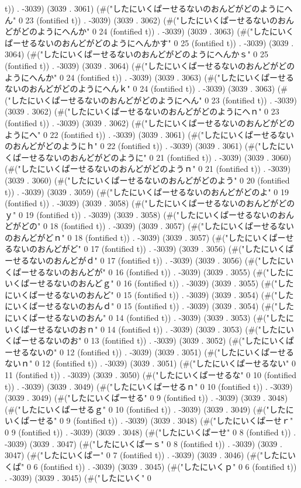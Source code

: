 t)) . -3039) (3039 . 3061) (#("したにいくぱーせるないのおんどがどのようにへん" 0 23 (fontified t)) . -3039) (3039 . 3062) (#("したにいくぱーせるないのおんどがどのようにへんか" 0 24 (fontified t)) . -3039) (3039 . 3063) (#("したにいくぱーせるないのおんどがどのようにへんかす" 0 25 (fontified t)) . -3039) (3039 . 3064) (#("したにいくぱーせるないのおんどがどのようにへんかｓ" 0 25 (fontified t)) . -3039) (3039 . 3064) (#("したにいくぱーせるないのおんどがどのようにへんか" 0 24 (fontified t)) . -3039) (3039 . 3063) (#("したにいくぱーせるないのおんどがどのようにへんｋ" 0 24 (fontified t)) . -3039) (3039 . 3063) (#("したにいくぱーせるないのおんどがどのようにへん" 0 23 (fontified t)) . -3039) (3039 . 3062) (#("したにいくぱーせるないのおんどがどのようにへｎ" 0 23 (fontified t)) . -3039) (3039 . 3062) (#("したにいくぱーせるないのおんどがどのようにへ" 0 22 (fontified t)) . -3039) (3039 . 3061) (#("したにいくぱーせるないのおんどがどのようにｈ" 0 22 (fontified t)) . -3039) (3039 . 3061) (#("したにいくぱーせるないのおんどがどのように" 0 21 (fontified t)) . -3039) (3039 . 3060) (#("したにいくぱーせるないのおんどがどのようｎ" 0 21 (fontified t)) . -3039) (3039 . 3060) (#("したにいくぱーせるないのおんどがどのよう" 0 20 (fontified t)) . -3039) (3039 . 3059) (#("したにいくぱーせるないのおんどがどのよ" 0 19 (fontified t)) . -3039) (3039 . 3058) (#("したにいくぱーせるないのおんどがどのｙ" 0 19 (fontified t)) . -3039) (3039 . 3058) (#("したにいくぱーせるないのおんどがどの" 0 18 (fontified t)) . -3039) (3039 . 3057) (#("したにいくぱーせるないのおんどがどｎ" 0 18 (fontified t)) . -3039) (3039 . 3057) (#("したにいくぱーせるないのおんどがど" 0 17 (fontified t)) . -3039) (3039 . 3056) (#("したにいくぱーせるないのおんどがｄ" 0 17 (fontified t)) . -3039) (3039 . 3056) (#("したにいくぱーせるないのおんどが" 0 16 (fontified t)) . -3039) (3039 . 3055) (#("したにいくぱーせるないのおんどｇ" 0 16 (fontified t)) . -3039) (3039 . 3055) (#("したにいくぱーせるないのおんど" 0 15 (fontified t)) . -3039) (3039 . 3054) (#("したにいくぱーせるないのおんｄ" 0 15 (fontified t)) . -3039) (3039 . 3054) (#("したにいくぱーせるないのおん" 0 14 (fontified t)) . -3039) (3039 . 3053) (#("したにいくぱーせるないのおｎ" 0 14 (fontified t)) . -3039) (3039 . 3053) (#("したにいくぱーせるないのお" 0 13 (fontified t)) . -3039) (3039 . 3052) (#("したにいくぱーせるないの" 0 12 (fontified t)) . -3039) (3039 . 3051) (#("したにいくぱーせるないｎ" 0 12 (fontified t)) . -3039) (3039 . 3051) (#("したにいくぱーせるない" 0 11 (fontified t)) . -3039) (3039 . 3050) (#("したにいくぱーせるな" 0 10 (fontified t)) . -3039) (3039 . 3049) (#("したにいくぱーせるｎ" 0 10 (fontified t)) . -3039) (3039 . 3049) (#("したにいくぱーせる" 0 9 (fontified t)) . -3039) (3039 . 3048) (#("したにいくぱーせるｇ" 0 10 (fontified t)) . -3039) (3039 . 3049) (#("したにいくぱーせる" 0 9 (fontified t)) . -3039) (3039 . 3048) (#("したにいくぱーせｒ" 0 9 (fontified t)) . -3039) (3039 . 3048) (#("したにいくぱーせ" 0 8 (fontified t)) . -3039) (3039 . 3047) (#("したにいくぱーｓ" 0 8 (fontified t)) . -3039) (3039 . 3047) (#("したにいくぱー" 0 7 (fontified t)) . -3039) (3039 . 3046) (#("したにいくぱ" 0 6 (fontified t)) . -3039) (3039 . 3045) (#("したにいくｐ" 0 6 (fontified t)) . -3039) (3039 . 3045) (#("したにいく" 0 